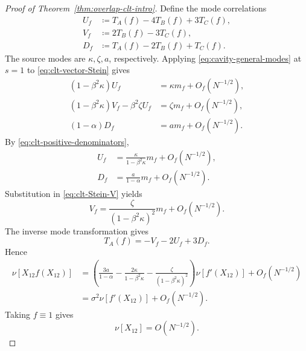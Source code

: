\documentclass[11pt]{article}
\numberwithin{equation}{section}
\newcommand{\1}{\mathbf 1}
\begin{document}
\begin{proof}[Proof of Theorem~\ref{thm:overlap-clt-intro}]
Define the mode correlations
\begin{align}
 U_f&\coloneqq T_A(f)-4T_B(f)+3T_C(f),
 \label{eq:clt-Uf}\\
 V_f&\coloneqq2T_B(f)-3T_C(f),
 \label{eq:clt-Vf}\\
 D_f&\coloneqq T_A(f)-2T_B(f)+T_C(f).
 \label{eq:clt-Df}
\end{align}
The source modes are $\kappa,\zeta,a$, respectively.  Applying
\eqref{eq:cavity-general-modes} at $s=1$ to
\eqref{eq:clt-vector-Stein} gives
\begin{align}
 (1-\beta^2\kappa)U_f
 &=\kappa m_f+O_f(N^{-1/2}),
 \label{eq:clt-Stein-U}\\
 (1-\beta^2\kappa)V_f-\beta^2\zeta U_f
 &=\zeta m_f+O_f(N^{-1/2}),
 \label{eq:clt-Stein-V}\\
 (1-\alpha)D_f
 &=a m_f+O_f(N^{-1/2}).
 \label{eq:clt-Stein-D}
\end{align}
By \eqref{eq:clt-positive-denominators},
\begin{align}
 U_f&=\frac{\kappa}{1-\beta^2\kappa}m_f+O_f(N^{-1/2}),
 \label{eq:clt-U-solved}\\
 D_f&=\frac{a}{1-\alpha}m_f+O_f(N^{-1/2}).
 \label{eq:clt-D-solved}
\end{align}
Substitution in \eqref{eq:clt-Stein-V} yields
\begin{equation}
 V_f=\frac{\zeta}{(1-\beta^2\kappa)^2}m_f+O_f(N^{-1/2}).
 \label{eq:clt-V-solved}
\end{equation}
The inverse mode transformation gives
\begin{equation}
 T_A(f)=-V_f-2U_f+3D_f.
 \label{eq:clt-inverse-mode-A}
\end{equation}
Hence
\begin{align}
 \nu[X_{12}f(X_{12})]
 &=
 \left(
 \frac{3a}{1-\alpha}
 -\frac{2\kappa}{1-\beta^2\kappa}
 -\frac{\zeta}{(1-\beta^2\kappa)^2}
 \right)\nu[f'(X_{12})]+O_f(N^{-1/2})
 \nonumber\\
 &=\sigma^2\nu[f'(X_{12})]+O_f(N^{-1/2}).
 \label{eq:clt-scalar-Stein}
\end{align}
Taking $f\equiv1$ gives
\begin{equation}
 \nu[X_{12}]=O(N^{-1/2}).
 \label{eq:clt-bias}
\end{equation}


\end{proof}
\end{document}
